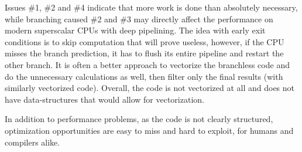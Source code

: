 \documentclass[12pt]{article}
\begin{document}
Issues \#1, \#2 and \#4 indicate that more work is done than absolutely necessary, while branching caused \#2 and \#3 may directly affect the performance on modern superscalar CPUs with deep pipelining. The idea with early exit conditions is to skip computation that will prove useless, however, if the CPU misses the branch prediction, it has to flush its entire pipeline and restart the other branch. It is often a better approach to vectorize the branchless code and do the unnecessary calculations as well, then filter only the final results (with similarly vectorized code). Overall, the code is not vectorized at all and does not have data-structures that would allow for vectorization.

In addition to performance problems, as the code is not clearly structured, optimization opportunities are easy to miss and hard to exploit, for humans and compilers alike.
\end{document}
